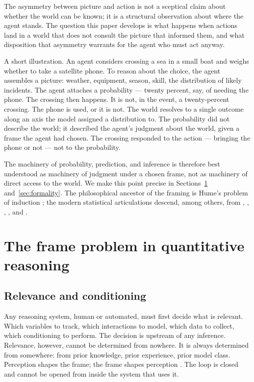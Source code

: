 \documentclass[11pt,a4paper]{article}
\begin{document}
The asymmetry between picture and action is not a sceptical claim about
whether the world can be known; it is a structural observation about where
the agent stands. The question this paper develops is what happens when
actions land in a world that does not consult the picture that informed
them, and what disposition that asymmetry warrants for the agent who must
act anyway.

A short illustration. An agent considers crossing a sea in a small boat
and weighs whether to take a satellite phone. To reason about the choice,
the agent assembles a picture: weather, equipment, season, skill, the
distribution of likely incidents. The agent attaches a probability ---
twenty percent, say, of needing the phone. The crossing then happens. It
is not, in the event, a twenty-percent crossing. The phone is used, or it
is not. The world resolves to a single outcome along an axis the model
assigned a distribution to. The probability did not describe the world;
it described the agent's judgment about the world, given a frame the
agent had chosen. The crossing responded to the action --- bringing the
phone or not --- not to the probability.

The machinery of probability, prediction, and inference is therefore best
understood as machinery of judgment under a chosen frame, not as machinery
of direct access to the world. We make this point precise in
Sections~\ref{sec:frame} and~\ref{sec:formality}. The philosophical
ancestor of the framing is Hume's problem of induction \citep{Hume1748};
the modern statistical articulations descend, among others, from
\citet{deFinetti1974}, \citet{Savage1954}, \citet{Jaynes2003},
\citet{Lindley2006}, and \citet{Pearl1988}.

\section{The frame problem in quantitative reasoning}
\label{sec:frame}

\subsection{Relevance and conditioning}

Any reasoning system, human or automated, must first decide what is
relevant. Which variables to track, which interactions to model, which
data to collect, which conditioning to perform. The decision is upstream
of any inference. Relevance, however, cannot be determined from nowhere.
It is always determined from somewhere: from prior knowledge, prior
experience, prior model class. Perception shapes the frame; the frame
shapes perception \citep{McCarthyHayes1969,Dennett1984}. The loop is
closed and cannot be opened from inside the system that uses it.
\end{document}
